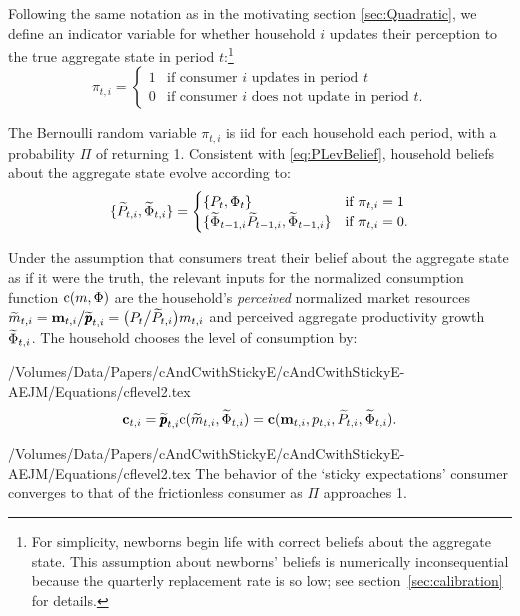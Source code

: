 Following the same notation as in the motivating section \ref{sec:Quadratic}, we define an indicator variable for whether household $i$ updates their perception to the true aggregate state in period $t$:\footnote{For simplicity, newborns begin life with correct beliefs about the aggregate state.  This assumption about newborns' beliefs is numerically inconsequential because the quarterly replacement rate is so low; see section~\ref{sec:calibration} for details.}
\begin{equation*}
\pi_{t,i} =
\begin{cases}
   1 & \text{if consumer $i$ updates in period $t$}
\\ 0 & \text{if consumer $i$ does not update in period $t$}.
\end{cases}
\end{equation*}

The Bernoulli random variable $\pi_{t,i}$ is iid for each household each period, with a probability $\Pi$ of returning 1.  Consistent with \eqref{eq:PLevBelief}, household beliefs about the aggregate state evolve according to:
\begin{equation}\label{eq:PLevBeliefSOE}
\{\widetilde{P}_{t,i},\widetilde{\Phi}_{t,i}\} = \begin{cases}
\{P_t, \Phi_t\} & \text{if } \pi_{t,i} = 1 \\
\{\widetilde{\Phi}_{t-1,i} \widetilde{P}_{t-1,i} , \widetilde{\Phi}_{t-1,i} \} & \text{if } \pi_{t,i} = 0.
\end{cases}
\end{equation}

Under the assumption that consumers treat their belief about the aggregate state as if it were the truth, the relevant inputs for the normalized consumption function $\mathrm{c}(m,\Phi)$ are the household's \textit{perceived} normalized market resources $\widetilde{m}_{t,i} = \mathbf{m}_{t,i}\big/\widetilde{\pmb{p}}_{t,i} = \big(P_t\big/\widetilde{P}_{t,i}\big)m_{t,i}$ and perceived aggregate productivity growth $\widetilde{\Phi}_{t,i}$.  The household chooses the level of consumption by:
\begin{verbatimwrite}{/Volumes/Data/Papers/cAndCwithStickyE/cAndCwithStickyE-AEJM/Equations/cflevel2.tex}
\begin{equation*}
   \mathbf{c}_{t,i} = \widetilde{\pmb{p}}_{t,i} \mathrm{c}(\widetilde{m}_{t,i},\widetilde{\Phi}_{t,i}) = \textbf{c}(\mathbf{m}_{t,i}, p_{t,i}, \widetilde{P}_{t,i}, \widetilde{\Phi}_{t,i}). \label{eq:cPerc}
\end{equation*}
\end{verbatimwrite}
 {/Volumes/Data/Papers/cAndCwithStickyE/cAndCwithStickyE-AEJM/Equations/cflevel2.tex}
The behavior of the `sticky expectations' consumer converges to that of the frictionless consumer as $\Pi$ approaches 1.

